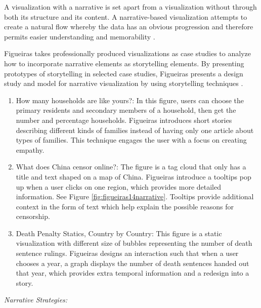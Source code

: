 \documentclass{egpubl}
\begin{document}
A visualization with a narrative is set apart from a visualization without through both its structure and its content. A narrative-based visualization attempts to create a natural flow whereby the data has an obvious progression and therefore permits easier understanding and memorability \cite{figueiras}.

Figueiras takes professionally produced visualizations as case studies to analyze how to incorporate narrative elements as storytelling elements. By presenting prototypes of storytelling in selected case studies, Figueiras presents a design study and model for narrative visualization by using storytelling techniques \cite{figueiras}.
\begin{enumerate}
\item How many households are like yours?: In this figure, users can choose the primary residents and secondary members of a household, then get the number and percentage households. Figueiras \cite{figueiras} introduces short stories describing different kinds of families instead of having only one article about types of families. This technique engages the user with a focus on creating empathy.
\item What does China censor online?: The figure is a tag cloud that only has a title and text shaped on a map of China. Figueiras \cite{figueiras} introduce a tooltips pop up when a user clicks on one region, which provides more detailed information. See Figure \ref{fig:figueiras14narrative}. Tooltips provide additional context in the form of text which help explain the possible reasons for censorship. 
\item Death Penalty Statics, Country by Country: This figure is a static visualization with different size of bubbles representing the number of death sentence rulings. Figueiras \cite{figueiras} designs an interaction such that when a user chooses a year, a graph displays the number of death sentences handed out that year, which provides extra temporal information and a redesign into a story. 
\end{enumerate}
\textit{Narrative Strategies:} 
\end{document}
